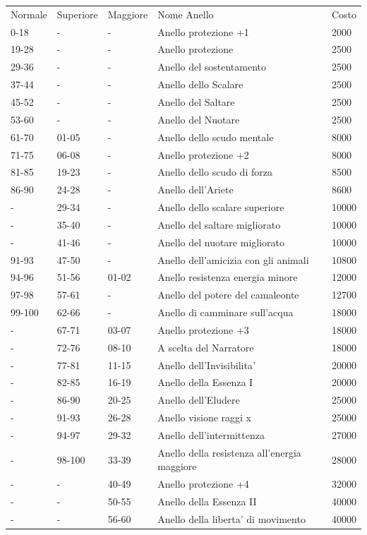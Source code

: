 \documentclass[a4paper,11pt,twoside,openany]{dndbook}
\begin{document}
{\begin{tabular}[c]{@{}lllll@{}}
\toprule 
Normale & Superiore & Maggiore & Nome Anello & Costo\tabularnewline
0-18 & - & - & Anello protezione \index{Anello protezione}+1 & 2000\tabularnewline
19-28 & - & - & Anello protezione \index{Anello protezione} & 2500\tabularnewline
29-36 & - & - & Anello del sostentamento\index{Anello del sostentamento} & 2500\tabularnewline
37-44 & - & - & Anello dello Scalare \index{Anello dello Scalare}& 2500\tabularnewline
45-52 & - & - & Anello del Saltare \index{Anello del Saltare}& 2500\tabularnewline
53-60 & - & - & Anello del Nuotare \index{Anello del Nuotare} & 2500\tabularnewline
61-70 & 01-05 & - & Anello dello scudo mentale \index{Anello dello scudo mentale} & 8000\tabularnewline
71-75 & 06-08 & - & Anello protezione +2 & 8000\tabularnewline
81-85 & 19-23 & - & Anello dello scudo di forza\index{Anello dello scudo di forza} & 8500\tabularnewline
86-90 & 24-28 & - & Anello dell'Ariete & 8600\tabularnewline
- & 29-34 & - & Anello dello scalare superiore & 10000\tabularnewline
- & 35-40 & - & Anello del saltare migliorato & 10000\tabularnewline
- & 41-46 & - & Anello del nuotare migliorato & 10000\tabularnewline
91-93 & 47-50 & - & Anello dell'amicizia con gli animali \index{Anello dell'amicizia con gli animali} & 10800\tabularnewline
94-96 & 51-56 & 01-02 & Anello resistenza energia minore \index{Anello resistenza energia} & 12000\tabularnewline
97-98 & 57-61 & - & Anello del potere del camaleonte \index{Anello del potere del camaleonte} & 12700\tabularnewline
99-100 & 62-66 & - & Anello di camminare sull'acqua\index{nello di camminare sull'acqua} & 18000\tabularnewline
- & 67-71 & 03-07 & Anello protezione +3 & 18000\tabularnewline
- & 72-76 & 08-10 & A scelta del Narratore & 18000\tabularnewline
- & 77-81 & 11-15 & Anello dell'Invisibilita' \index{nello dell'Invisibilita'} & 20000\tabularnewline
- & 82-85 & 16-19 & Anello della Essenza I \index{Anello della Essenza} & 20000\tabularnewline
- & 86-90 & 20-25 & Anello dell'Eludere \index{Anello dell'Eludere} & 25000\tabularnewline
- & 91-93 & 26-28 & Anello visione raggi x\index{Anello visione raggi x} & 25000\tabularnewline
- & 94-97 & 29-32 & Anello dell'intermittenza \index{Anello dell'intermittenza} & 27000\tabularnewline
- & 98-100 & 33-39 & Anello della resistenza all'energia maggiore & 28000\tabularnewline
- & - & 40-49 & Anello protezione +4 & 32000\tabularnewline
- & - & 50-55 & Anello della Essenza II & 40000\tabularnewline
- & - & 56-60 & Anello della liberta' di movimento \index{Anello della liberta' di movimento} & 40000\tabularnewline

\end{tabular}}
\end{document}
